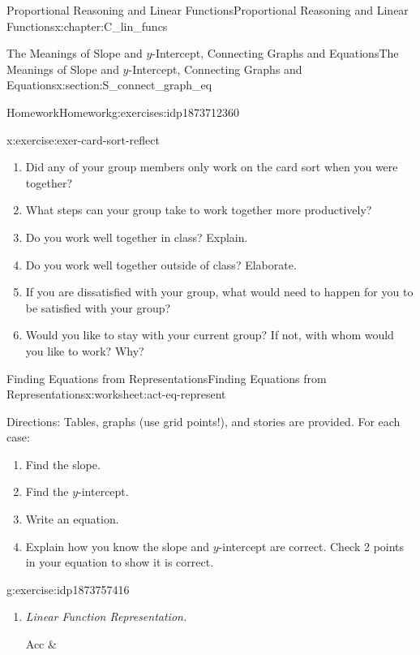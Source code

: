 \documentclass[oneside,10pt,]{book}
\newcommand{\tabularfont}{\relax}
\newcommand{\lititle}[1]{{\slshape#1}}
\numberwithin{equation}{chapter}
\newcommand{\hrulethin}  {\noalign{\hrule height 0.04em}}
\begin{document}
\begin{chapterptx}{Proportional Reasoning and Linear Functions}{}{Proportional Reasoning and Linear Functions}{}{}{x:chapter:C_lin_funcs}
\begin{sectionptx}{The Meanings of Slope and \(y\)-Intercept, Connecting Graphs and Equations}{}{The Meanings of Slope and \(y\)-Intercept, Connecting Graphs and Equations}{}{}{x:section:S_connect_graph_eq}
\begin{exercises-subsection}{Homework}{}{Homework}{}{}{g:exercises:idp1873712360}
\begin{divisionexercise}{6}{}{}{x:exercise:exer-card-sort-reflect}
\begin{enumerate}[font=\bfseries,label=(\alph*),ref=\alph*]
\item{}Did any of your group members only work on the card sort when you were together?%
\item{}What steps can your group take to work together more productively?%
\item{}Do you work well together in class? Explain.%
\item{}Do you work well together outside of class? Elaborate.%
\item{}If you are dissatisfied with your group, what would need to happen for you to be satisfied with your group?%
\item{}Would you like to stay with your current group? If not, with whom would you like to work? Why?%
\end{enumerate}
\end{divisionexercise}%
\end{exercises-subsection}
%
%
\typeout{************************************************}
\typeout{************************************************}
%
\begin{worksheet-subsection}{Finding Equations from Representations}{}{Finding Equations from Representations}{}{}{x:worksheet:act-eq-represent}
\begin{introduction}{}%
Directions: Tables, graphs (use grid points!), and stories are provided. For each case:%
\begin{enumerate}[label=(\alph*)]
\item{}Find the slope.%
\item{}Find the \(y\)-intercept.%
\item{}Write an equation.%
\item{}Explain how you know the slope and \(y\)-intercept are correct. Check 2 points in your equation to show it is correct.%
\end{enumerate}
%
\end{introduction}%
\begin{divisionexercise}{1}{}{}{g:exercise:idp1873757416}%
\begin{enumerate}[font=\bfseries,label=(\alph*),ref=\alph*]
\item{}\lititle{Linear Function Representation.}\par%
\begin{center}%
{\tabularfont%
\begin{tabular}{Acc}\hrulethin
{}&\tabularnewline\hrulethin

\end{tabular}}
\end{center}
\end{enumerate}
\end{divisionexercise}
\end{worksheet-subsection}
\end{sectionptx}
\end{chapterptx}
\end{document}
